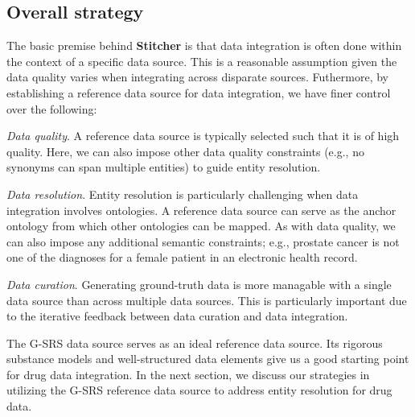 \documentclass{bioinfo}
\newcommand\st{\textbf{Stitcher}}
\begin{document}
\subsection{Overall strategy}
The basic premise behind \st{} is that data integration is often done within the context of a specific data source. This is a reasonable assumption given the data quality varies when integrating across disparate sources. Futhermore, by establishing a reference data source for data integration, we have finer control over the following:
\begin{unlist}
\item{\emph{Data quality}.} A reference data source is typically selected such that it is of high quality. Here, we can also impose other data quality constraints (e.g., no synonyms can span multiple entities) to guide entity resolution.
\item{\emph{Data resolution}.} Entity resolution is particularly challenging when data integration involves ontologies. A reference data source can serve as the anchor ontology from which other ontologies can be mapped. As with data quality, we can also impose any additional semantic constraints; e.g., prostate cancer is not one of the diagnoses for a female patient in an electronic health record.
\item{\emph{Data curation}.} Generating ground-truth data is more managable with a single data source than across multiple data sources. This is particularly important due to the iterative feedback between data curation and data integration.
\end{unlist}
The G-SRS data source serves as an ideal reference data source. Its rigorous substance models and well-structured data elements give us a good starting point for drug data integration. In the next section, we discuss our strategies in utilizing the G-SRS reference data source to address entity resolution for drug data.
\end{document}
